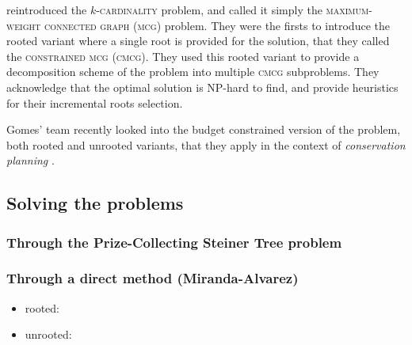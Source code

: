 		\Textcite{lee1998decomposition} reintroduced the \textsc{$k$-cardinality \mwcs{}} problem, and called it simply the \textsc{maximum-weight connected graph} (\textsc{mcg}) problem.
		They were the firsts to introduce the rooted variant where a single root is provided for the solution, that they called the \textsc{constrained mcg} (\textsc{cmcg}).
		They used this rooted variant to provide a decomposition scheme of the \mwcs{} problem into multiple \textsc{cmcg} subproblems.
		They acknowledge that the optimal solution is NP-hard to find, and provide heuristics for their incremental roots selection.

		Gomes' team recently looked into the budget constrained version of the problem, both rooted and unrooted variants, that they apply in the context of \emph{conservation planning} \parencites{conrad2007connections}{gomes2008connections}{dilkina2010solving}.

	\subsection{Solving the \mwcs{} problems}
	\label{subsec:solvingmwcs}

	\subsubsection{Through the Prize-Collecting Steiner Tree problem}

	\subsubsection{Through a direct method (Miranda-Alvarez)}

		\begin{itemize}
			\item rooted: \cite{alvarez2013rooted}
			\item unrooted: \cite{alvarez2013maximum}
		\end{itemize}

